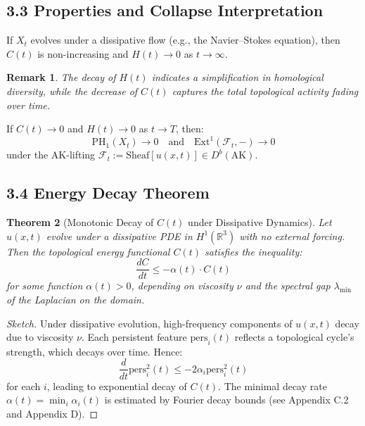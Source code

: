 \documentclass[11pt]{article}
\newtheorem{theorem}{Theorem}[section]
\newtheorem{remark}[theorem]{Remark}
\begin{document}
\subsection{3.3 Properties and Collapse Interpretation}

\begin{lemma}
If $X_t$ evolves under a dissipative flow (e.g., the Navier--Stokes equation), then $C(t)$ is non-increasing and $H(t) \to 0$ as $t \to \infty$.
\end{lemma}

\begin{remark}
The decay of $H(t)$ indicates a simplification in homological diversity, while the decrease of $C(t)$ captures the total topological activity fading over time.
\end{remark}

\begin{proposition}
If $C(t) \to 0$ and $H(t) \to 0$ as $t \to T$, then:
\[
\mathrm{PH}_1(X_t) \to 0 \quad \text{and} \quad \mathrm{Ext}^1(\mathcal{F}_t, -) \to 0
\]
under the AK-lifting $\mathcal{F}_t := \mathrm{Sheaf}[u(x,t)] \in D^b(\mathrm{AK})$.
\end{proposition}

\subsection{3.4 Energy Decay Theorem}

\begin{theorem}[Monotonic Decay of $C(t)$ under Dissipative Dynamics]
Let $u(x,t)$ evolve under a dissipative PDE in $H^1(\mathbb{R}^3)$ with no external forcing.  
Then the topological energy functional $C(t)$ satisfies the inequality:
\[
\frac{dC}{dt} \leq -\alpha(t) \cdot C(t)
\]
for some function $\alpha(t) > 0$, depending on viscosity $\nu$ and the spectral gap $\lambda_{\min}$ of the Laplacian on the domain.
\end{theorem}

\begin{proof}[Sketch]
Under dissipative evolution, high-frequency components of $u(x,t)$ decay due to viscosity $\nu$.  
Each persistent feature $\text{pers}_i(t)$ reflects a topological cycle's strength, which decays over time. Hence:
\[
\frac{d}{dt} \mathrm{pers}_i^2(t) \leq -2\alpha_i \mathrm{pers}_i^2(t)
\]
for each $i$, leading to exponential decay of $C(t)$. The minimal decay rate $\alpha(t) = \min_i \alpha_i(t)$ is estimated by Fourier decay bounds (see Appendix C.2 and Appendix D).
\end{proof}
\end{document}
